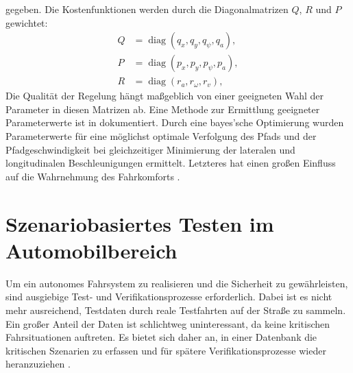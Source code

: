 \noindent gegeben. Die Kostenfunktionen werden durch die Diagonalmatrizen $Q$, $R$ und $P$ gewichtet:
\begin{equation}
    \begin{split}
        Q &= \operatorname{diag}(q_x, q_y, q_\psi, q_a), \\
        P &= \operatorname{diag}(p_x, p_y, p_\psi, p_a), \\
        R &= \operatorname{diag}(r_a, r_\omega, r_v),
    \end{split}
\end{equation}
Die Qualität der Regelung hängt maßgeblich von einer geeigneten Wahl der Parameter in diesen Matrizen ab. Eine Methode zur Ermittlung geeigneter Parameterwerte ist in \cite{math11020465} dokumentiert. Durch eine bayes'sche Optimierung wurden Parameterwerte für eine möglichst optimale Verfolgung des Pfads und der Pfadgeschwindigkeit bei gleichzeitiger Minimierung der lateralen und longitudinalen Beschleunigungen ermittelt. Letzteres hat einen großen Einfluss auf die Wahrnehmung des Fahrkomforts \cite{BELLEM201890}.
    
\section{Szenariobasiertes Testen im Automobilbereich} \label{sec:SoftwaretestsAutomobil}
Um ein autonomes Fahrsystem zu realisieren und die Sicherheit zu gewährleisten, sind ausgiebige Test- und Verifikationsprozesse erforderlich. Dabei ist es nicht mehr ausreichend, Testdaten durch reale Testfahrten auf der Straße zu sammeln. Ein großer Anteil der Daten ist schlichtweg uninteressant, da keine kritischen Fahrsituationen auftreten. Es bietet sich daher an, in einer Datenbank die kritischen Szenarien zu erfassen und für spätere Verifikationsprozesse wieder heranzuziehen \cite{Nalic2020}.

